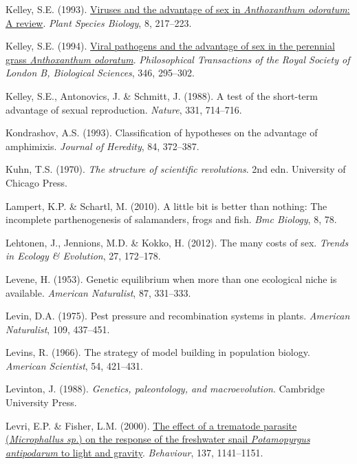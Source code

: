 \documentclass[
  letterpaper,
]{book}
\newlength{\cslhangindent}
\newenvironment{CSLReferences}[2] %
 {\begin{list}{}{%
  \setlength{\itemindent}{0pt}
  \setlength{\leftmargin}{0pt}
  \setlength{\parsep}{0pt}
  \ifodd #1
   \setlength{\leftmargin}{\cslhangindent}
   \setlength{\itemindent}{-1\cslhangindent}
  \fi
  \setlength{\itemsep}{#2\baselineskip}}}
 {\end{list}}
\begin{document}
\begin{CSLReferences}{1}{0}
Kelley, S.E. (1993).
\href{https://doi.org/10.1111/j.1442-1984.1993.tb00072.x}{Viruses and
the advantage of sex in \emph{{A}nthoxanthum odoratum}: A review}.
\emph{Plant Species Biology}, 8, 217--223.

Kelley, S.E. (1994). \href{https://doi.org/10.1098/rstb.1994.0146}{Viral
pathogens and the advantage of sex in the perennial grass
\emph{{A}nthoxanthum odoratum}}. \emph{Philosophical Transactions of the
Royal Society of London B, Biological Sciences}, 346, 295--302.

Kelley, S.E., Antonovics, J. \& Schmitt, J. (1988). A test of the
short-term advantage of sexual reproduction. \emph{Nature}, 331,
714--716.

Kondrashov, A.S. (1993). Classification of hypotheses on the advantage
of amphimixis. \emph{Journal of Heredity}, 84, 372--387.

Kuhn, T.S. (1970). \emph{The structure of scientific revolutions}. 2nd
edn. University of Chicago Press.

Lampert, K.P. \& Schartl, M. (2010). A little bit is better than
nothing: The incomplete parthenogenesis of salamanders, frogs and fish.
\emph{Bmc Biology}, 8, 78.

Lehtonen, J., Jennions, M.D. \& Kokko, H. (2012). The many costs of sex.
\emph{Trends in Ecology \& Evolution}, 27, 172--178.

Levene, H. (1953). Genetic equilibrium when more than one ecological
niche is available. \emph{American Naturalist}, 87, 331--333.

Levin, D.A. (1975). Pest pressure and recombination systems in plants.
\emph{American Naturalist}, 109, 437--451.

Levins, R. (1966). The strategy of model building in population biology.
\emph{American Scientist}, 54, 421--431.

Levinton, J. (1988). \emph{Genetics, paleontology, and macroevolution}.
Cambridge University Press.

Levri, E.P. \& Fisher, L.M. (2000).
\href{https://doi.org/10.1163/156853900502565}{The effect of a trematode
parasite (\emph{{M}icrophallus sp.}) {o}n the response of the freshwater
snail \emph{{P}otamopyrgus antipodarum} to light and gravity}.
\emph{Behaviour}, 137, 1141--1151.


\end{CSLReferences}
\end{document}
